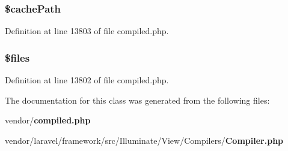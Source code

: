 \subsubsection[{\$cache\+Path}]{\setlength{\rightskip}{0pt plus 5cm}\$cache\+Path\hspace{0.3cm}{\ttfamily [protected]}}\label{class_illuminate_1_1_view_1_1_compilers_1_1_compiler_a734d3a9ccfbceeabcb79877ec9eb7118}


Definition at line 13803 of file compiled.\+php.

\subsubsection[{\$files}]{\setlength{\rightskip}{0pt plus 5cm}\$files\hspace{0.3cm}{\ttfamily [protected]}}\label{class_illuminate_1_1_view_1_1_compilers_1_1_compiler_a9590b15215a21e9b42eb546aeef79704}


Definition at line 13802 of file compiled.\+php.



The documentation for this class was generated from the following files\+:\begin{DoxyCompactItemize}
\item 
vendor/{\bf compiled.\+php}\item 
vendor/laravel/framework/src/\+Illuminate/\+View/\+Compilers/{\bf Compiler.\+php}\end{DoxyCompactItemize}
